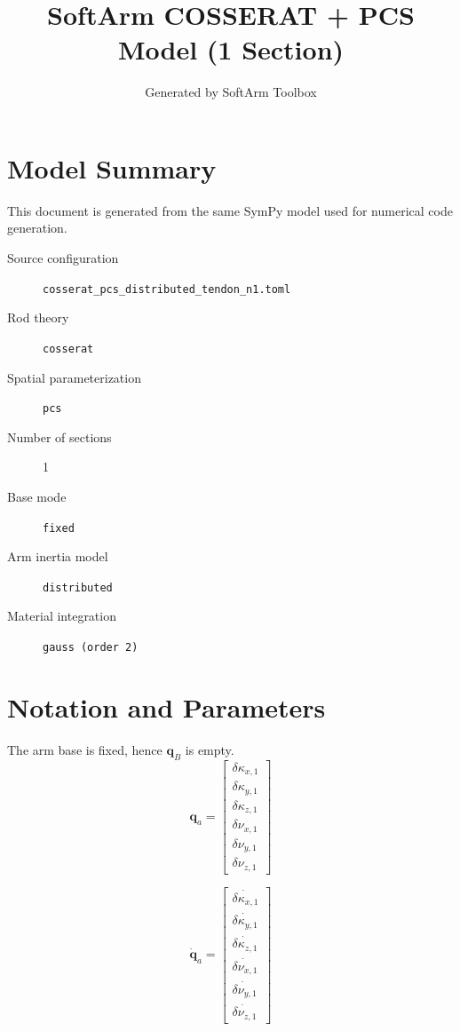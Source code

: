 \documentclass[11pt]{article}
\title{SoftArm COSSERAT + PCS Model (1 Section)}
\author{Generated by SoftArm Toolbox}
\date{}
\begin{document}
\maketitle

\section{Model Summary}
This document is generated from the same SymPy model used for numerical code generation.
\begin{description}
\item[Source configuration] \texttt{cosserat\_pcs\_distributed\_tendon\_n1.toml}
\item[Rod theory] \texttt{cosserat}
\item[Spatial parameterization] \texttt{pcs}
\item[Number of sections] 1
\item[Base mode] \texttt{fixed}
\item[Arm inertia model] \texttt{distributed}
\item[Material integration] \texttt{gauss (order 2)}
\end{description}

\section{Notation and Parameters}
The arm base is fixed, hence $\boldsymbol q_B$ is empty.
\begin{equation}
\boldsymbol q_a=\begin{bmatrix}\delta\kappa_{x,1}\\\delta\kappa_{y,1}\\\delta\kappa_{z,1}\\\delta\nu_{x,1}\\\delta\nu_{y,1}\\\delta\nu_{z,1}\end{bmatrix}
\end{equation}

\begin{equation}
\dot{\boldsymbol q}_a=\begin{bmatrix}\dot{\delta\kappa_{x,1}}\\\dot{\delta\kappa_{y,1}}\\\dot{\delta\kappa_{z,1}}\\\dot{\delta\nu_{x,1}}\\\dot{\delta\nu_{y,1}}\\\dot{\delta\nu_{z,1}}\end{bmatrix}
\end{equation}
\end{document}
